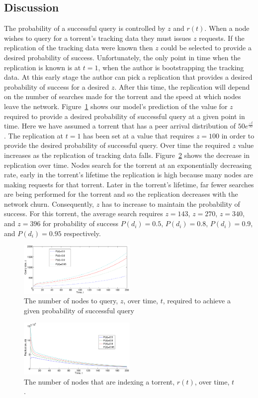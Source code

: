\subsection{Discussion}\label{sec:extension:discussion}

    The probability of a successful query is controlled by $z$ and $r(t)$. When a node wishes to query for a torrent's tracking data they must issues $z$ requests. If the replication of the tracking data were known then $z$ could be selected to provide a desired probability of success. Unfortunately, the only point in time when the replication is known is at $t=1$, when the author is bootstrapping the tracking data. At this early stage the author can pick a replication that provides a desired probability of success for a desired $z$. After this time, the replication will depend on the number of searches made for the torrent and the speed at which nodes leave the network. Figure~\ref{fig:required_z} shows our model's prediction of the value for $z$ required to provide a desired probability of successful query at a given point in time. Here we have assumed a torrent that has a peer arrival distribution of $50e^{\frac{-t}{50}}$. The replication at $t=1$ has been set at a value that requires $z=100$ in order to provide the desired probability of successful query. Over time the required $z$ value increases as the replication of tracking data falls. Figure~\ref{fig:replication} shows the decrease in replication over time. Nodes search for the torrent at an exponentially decreasing rate, early in the torrent's lifetime the replication is high because many nodes are making requests for that torrent. Later in the torrent's lifetime, far fewer searches are being performed for the torrent and so the replication decreases with the network churn. Consequently, $z$ has to increase to maintain the probability of success. For this torrent, the average search requires $z=143$, $z=270$, $z=340$, and $z=396$ for probability of success $P(d_i)=0.5$, $P(d_i)=0.8$, $P(d_i)=0.9$, and $P(d_i)=0.95$ respectively.

    \begin{figure}[t]
        \centering
        \includegraphics[width=0.5\textwidth]{Images/RequiredZ.eps}
        \caption{The number of nodes to query, $z$, over time, $t$, required to achieve a given probability of successful query}
        \label{fig:required_z}
    \end{figure}

    \begin{figure}[t]
        \centering
        \includegraphics[width=0.5\textwidth]{Images/Replication.eps}
        \caption{The number of nodes that are indexing a torrent, $r(t)$, over time, $t$.}
        \label{fig:replication}
    \end{figure}

